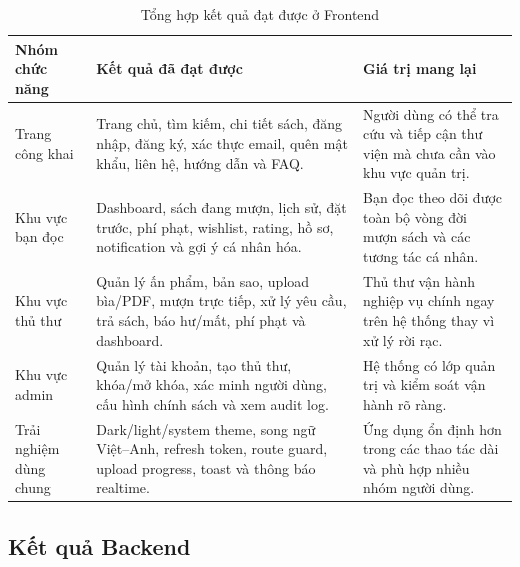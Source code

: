 \begin{table}[H]
\centering
\small
\begin{tabularx}{\textwidth}{|p{3.4cm}|X|p{3.5cm}|}
\hline
\textbf{Nhóm chức năng} & \textbf{Kết quả đã đạt được} & \textbf{Giá trị mang lại} \\
\hline
Trang công khai &
Trang chủ, tìm kiếm, chi tiết sách, đăng nhập, đăng ký, xác thực email, quên mật khẩu, liên hệ, hướng dẫn và FAQ. &
Người dùng có thể tra cứu và tiếp cận thư viện mà chưa cần vào khu vực quản trị. \\
\hline
Khu vực bạn đọc &
Dashboard, sách đang mượn, lịch sử, đặt trước, phí phạt, wishlist, rating, hồ sơ, notification và gợi ý cá nhân hóa. &
Bạn đọc theo dõi được toàn bộ vòng đời mượn sách và các tương tác cá nhân. \\
\hline
Khu vực thủ thư &
Quản lý ấn phẩm, bản sao, upload bìa/PDF, mượn trực tiếp, xử lý yêu cầu, trả sách, báo hư/mất, phí phạt và dashboard. &
Thủ thư vận hành nghiệp vụ chính ngay trên hệ thống thay vì xử lý rời rạc. \\
\hline
Khu vực admin &
Quản lý tài khoản, tạo thủ thư, khóa/mở khóa, xác minh người dùng, cấu hình chính sách và xem audit log. &
Hệ thống có lớp quản trị và kiểm soát vận hành rõ ràng. \\
\hline
Trải nghiệm dùng chung &
Dark/light/system theme, song ngữ Việt--Anh, refresh token, route guard, upload progress, toast và thông báo realtime. &
Ứng dụng ổn định hơn trong các thao tác dài và phù hợp nhiều nhóm người dùng. \\
\hline
\end{tabularx}
\caption{Tổng hợp kết quả đạt được ở Frontend}
\label{tab:conclusion_fe_results}
\end{table}

\subsection{Kết quả Backend}

